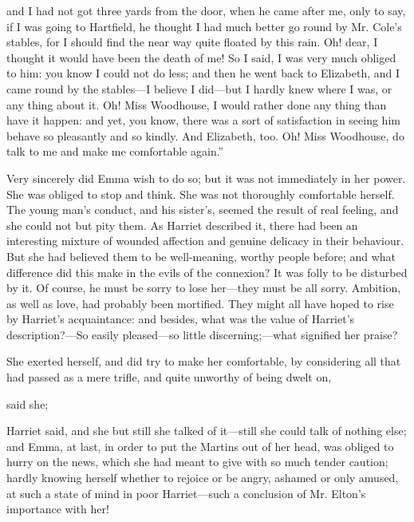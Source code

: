 and I had not got three yards from the door, when he came after me, only to say, if I was going to Hartfield, he thought I had much better go round by Mr. Cole's stables, for I should find the near way quite floated by this rain. Oh! dear, I thought it would have been the death of me! So I said, I was very much obliged to him: you know I could not do less; and then he went back to Elizabeth, and I came round by the stables---I believe I did---but I hardly knew where I was, or any thing about it. Oh! Miss Woodhouse, I would rather done any thing than have it happen: and yet, you know, there was a sort of satisfaction in seeing him behave so pleasantly and so kindly. And Elizabeth, too. Oh! Miss Woodhouse, do talk to me and make me comfortable again.”

Very sincerely did Emma wish to do so; but it was not immediately in her power. She was obliged to stop and think. She was not thoroughly comfortable herself. The young man's conduct, and his sister's, seemed the result of real feeling, and she could not but pity them. As Harriet described it, there had been an interesting mixture of wounded affection and genuine delicacy in their behaviour. But she had believed them to be well-meaning, worthy people before; and what difference did this make in the evils of the connexion? It was folly to be disturbed by it. Of course, he must be sorry to lose her---they must be all sorry. Ambition, as well as love, had probably been mortified. They might all have hoped to rise by Harriet's acquaintance: and besides, what was the value of Harriet's description?---So easily pleased---so little discerning;---what signified her praise?

She exerted herself, and did try to make her comfortable, by considering all that had passed as a mere trifle, and quite unworthy of being dwelt on,

 said she; 

Harriet said,  and she  but still she talked of it---still she could talk of nothing else; and Emma, at last, in order to put the Martins out of her head, was obliged to hurry on the news, which she had meant to give with so much tender caution; hardly knowing herself whether to rejoice or be angry, ashamed or only amused, at such a state of mind in poor Harriet---such a conclusion of Mr. Elton's importance with her!

